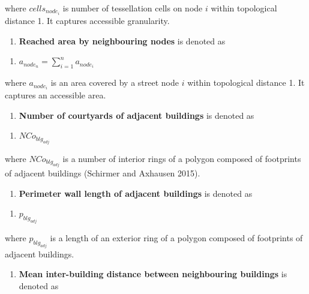 \documentclass[
  letterpaper,
  DIV=11,
  numbers=noendperiod]{scrartcl}
\providecommand{\tightlist}{%
  \setlength{\itemsep}{0pt}\setlength{\parskip}{0pt}}\usepackage{longtable,booktabs,array}
\begin{document}
where \(cells_{node_i}\) is number of tessellation cells on node \(i\)
within topological distance 1. It captures accessible granularity.

\begin{enumerate}
\def\labelenumi{\arabic{enumi}.}
\setcounter{enumi}{33}
\tightlist
\item
  \textbf{Reached area by neighbouring nodes} is denoted as
\end{enumerate}

\begin{enumerate}
\def\labelenumi{(\arabic{enumi})}
\setcounter{enumi}{33}
\tightlist
\item
  \(a_{node_n} = \sum_{i=1}^{n} a_{node_i}\)
\end{enumerate}

where \(a_{node_i}\) is an area covered by a street node \(i\) within
topological distance 1. It captures an accessible area.

\begin{enumerate}
\def\labelenumi{\arabic{enumi}.}
\setcounter{enumi}{34}
\tightlist
\item
  \textbf{Number of courtyards of adjacent buildings} is denoted as
\end{enumerate}

\begin{enumerate}
\def\labelenumi{(\arabic{enumi})}
\setcounter{enumi}{34}
\tightlist
\item
  \(NCo_{blg_{adj}}\)
\end{enumerate}

where \(NCo_{blg_{adj}}\) is a number of interior rings of a polygon
composed of footprints of adjacent buildings (Schirmer and Axhausen
2015).

\begin{enumerate}
\def\labelenumi{\arabic{enumi}.}
\setcounter{enumi}{35}
\tightlist
\item
  \textbf{Perimeter wall length of adjacent buildings} is denoted as
\end{enumerate}

\begin{enumerate}
\def\labelenumi{(\arabic{enumi})}
\setcounter{enumi}{35}
\tightlist
\item
  \(p_{blg_{adj}}\)
\end{enumerate}

where \(p_{blg_{adj}}\) is a length of an exterior ring of a polygon
composed of footprints of adjacent buildings.

\begin{enumerate}
\def\labelenumi{\arabic{enumi}.}
\setcounter{enumi}{36}
\tightlist
\item
  \textbf{Mean inter-building distance between neighbouring buildings}
  is denoted as
\end{enumerate}
\end{document}
